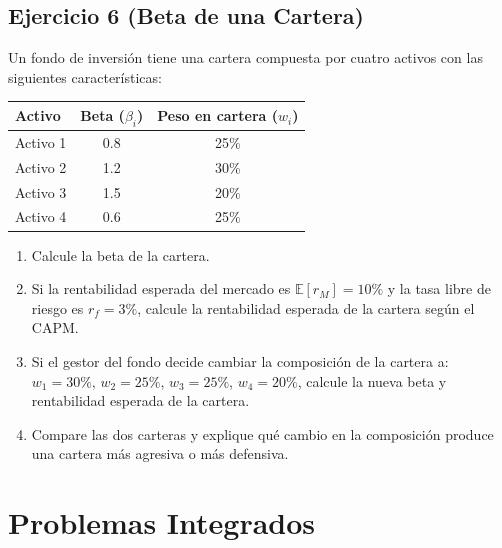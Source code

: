 \documentclass[12pt,a4paper]{article}
\newcommand{\E}{\mathbb{E}}
\newenvironment{ejercicio}[1]{\subsection*{Ejercicio #1}}{}
\begin{document}
\begin{ejercicio}{6 (Beta de una Cartera)}
Un fondo de inversión tiene una cartera compuesta por cuatro activos con las siguientes características:
\begin{center}
\begin{tabular}{lcc}
\toprule
Activo & Beta ($\beta_i$) & Peso en cartera ($w_i$) \\
\midrule
Activo 1 & 0.8 & 25\% \\
Activo 2 & 1.2 & 30\% \\
Activo 3 & 1.5 & 20\% \\
Activo 4 & 0.6 & 25\% \\
\bottomrule
\end{tabular}
\end{center}

\begin{enumerate}[label=\alph*)]
  \item Calcule la beta de la cartera.
  \item Si la rentabilidad esperada del mercado es $\E[r_M] = 10\%$ y la tasa libre de riesgo es $r_f = 3\%$, calcule la rentabilidad esperada de la cartera según el CAPM.
  \item Si el gestor del fondo decide cambiar la composición de la cartera a: $w_1 = 30\%$, $w_2 = 25\%$, $w_3 = 25\%$, $w_4 = 20\%$, calcule la nueva beta y rentabilidad esperada de la cartera.
  \item Compare las dos carteras y explique qué cambio en la composición produce una cartera más agresiva o más defensiva.
\end{enumerate}
\end{ejercicio}

\section{Problemas Integrados}
\end{document}
